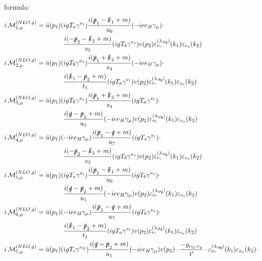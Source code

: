 formula:
\begin{align}
i\Md^{(NLO,g)}_{1,\mu} &= \bar u(p_1)(igT_a\gamma^{\nu_i})\frac{i(\slashed{p}_1-\slashed{k}_1+m)}{u_6}(-i e e_H \gamma_\mu)\cdot\nonumber\\
 &\hspace{40pt}\frac{i(-\slashed{p}_2-\slashed{k}_2+m)}{s_3}(igT_b\gamma^{\nu_o})v(p_2)\varepsilon^{(\lambda_{\Pg})}_{\nu_i}(k_1)\varepsilon_{\nu_o}(k_2)\\
i\Md^{(NLO,g)}_{2,\mu} &= \bar u(p_1)(igT_b\gamma^{\nu_o})\frac{i(\slashed{p}_1+\slashed{k}_2+m)}{s_4}(-i e e_H \gamma_\mu)\cdot\nonumber\\
 &\hspace{40pt}\frac{i(\slashed{k}_1-\slashed{p}_2+m)}{t_1}(igT_a\gamma^{\nu_i})v(p_2)\varepsilon^{(\lambda_{\Pg})}_{\nu_i}(k_1)\varepsilon_{\nu_o}(k_2)\\
i\Md^{(NLO,g)}_{3,\mu} &= \bar u(p_1)(igT_b\gamma^{\nu_o})\frac{i(\slashed{p}_1+\slashed{k}_2+m)}{s_4}(igT_a\gamma^{\nu_i})\cdot\nonumber\\
 &\hspace{40pt}\frac{i(\slashed{q}-\slashed{p}_2+m)}{u_1}(-i e e_H \gamma_\mu)v(p_2)\varepsilon^{(\lambda_{\Pg})}_{\nu_i}(k_1)\varepsilon_{\nu_o}(k_2)\\
i\Md^{(NLO,g)}_{4,\mu} &= \bar u(p_1)(-i e e_H \gamma_\mu)\frac{i(\slashed{p}_1-\slashed{q}+m)}{u_7}(igT_a\gamma^{\nu_i})\cdot\nonumber\\
 &\hspace{40pt}\frac{i(-\slashed{p}_2-\slashed{k}_2+m)}{s_3}(igT_b\gamma^{\nu_o})v(p_2)\varepsilon^{(\lambda_{\Pg})}_{\nu_i}(k_1)\varepsilon_{\nu_o}(k_2)\\
i\Md^{(NLO,g)}_{5,\mu} &= \bar u(p_1)(igT_a\gamma^{\nu_i})\frac{i(\slashed{p}_1-\slashed{k}_1+m)}{u_6}(igT_b\gamma^{\nu_o})\cdot\nonumber\\
 &\hspace{40pt}\frac{i(\slashed{q}-\slashed{p}_2+m)}{u_1}(-i e e_H \gamma_\mu)v(p_2)\varepsilon^{(\lambda_{\Pg})}_{\nu_i}(k_1)\varepsilon_{\nu_o}(k_2)\\
i\Md^{(NLO,g)}_{6,\mu} &= \bar u(p_1)(-i e e_H \gamma_\mu)\frac{i(\slashed{p}_1-\slashed{q}+m)}{u_7}(igT_b\gamma^{\nu_o})\cdot\nonumber\\
 &\hspace{40pt}\frac{i(\slashed{k}_1-\slashed{p}_2+m)}{t_1}(igT_a\gamma^{\nu_i})v(p_2)\varepsilon^{(\lambda_{\Pg})}_{\nu_i}(k_1)\varepsilon_{\nu_o}(k_2)\\
i\Md^{(NLO,g)}_{7,\mu} &= \bar u(p_1)(igT_c\gamma^{\nu_Q})\frac{i(\slashed{q}-\slashed{p}_2+m)}{u_1}(-i e e_H \gamma_\mu)v(p_2)\cdot\frac{-g_{\nu_Q,\nu_g}}{t'}\cdot\varepsilon^{(\lambda_{\Pg})}_{\nu_i}(k_1)\varepsilon_{\nu_o}(k_2)\cdot\nonumber\\

\end{align}
